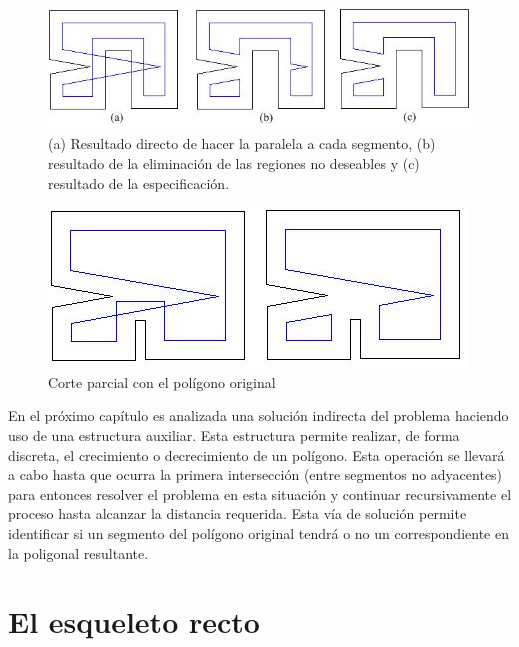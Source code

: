 \documentclass[12pt,english]{report}
\begin{document}
\begin{figure}[htbp]
\begin{center}
\includegraphics[width=15cm]{comp2.jpg}%
\end{center}
\caption{(a) Resultado directo de hacer la paralela a cada segmento, (b) resultado de la eliminaci\'on de las regiones no deseables y (c) resultado de la especificaci\'on.   }
\end{figure}

\begin{figure}[htbp]
\begin{center}
\includegraphics{parcialt.jpg}%
\end{center}
\caption{Corte parcial con el pol\'igono original }
\end{figure}

En el pr\'oximo cap\'itulo es analizada una soluci\'on indirecta del problema haciendo uso de una estructura auxiliar. Esta estructura permite realizar, de forma discreta, el crecimiento o decrecimiento de un pol\'igono. Esta operaci\'on se llevar\'a a cabo hasta que ocurra la primera intersecci\'on (entre segmentos no adyacentes) para entonces resolver el problema en esta situaci\'on y continuar recursivamente el proceso hasta alcanzar la distancia requerida. Esta v\'ia de soluci\'on permite identificar si un segmento del pol\'igono original tendr\'a o no un correspondiente en la poligonal resultante. 



\chapter{El esqueleto recto}
\end{document}
